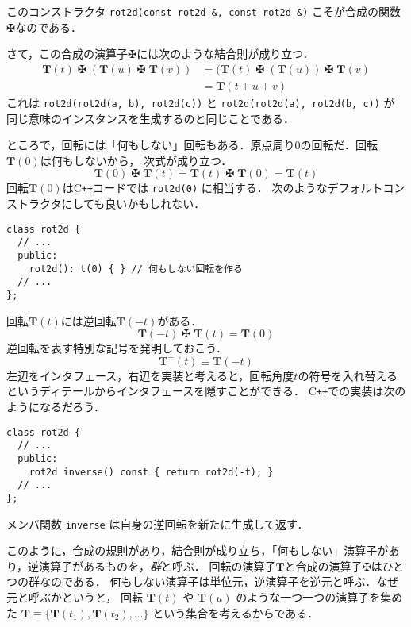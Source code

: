 \documentclass{jsbook}
\newcommand{\cxx}{\textrm{C}\texttt{++}}
\newcommand{\ccode}[1]{\texttt{#1}}
\newcommand{\keyword}[1]{\emph{#1}}
\newcommand{\bop}[1]{\boldsymbol{#1}}
\newcommand{\bg}[1]{\mathbf{#1}}
\newcommand{\opmaltese}{\mathop{\maltese}}
\begin{document}
このコンストラクタ \ccode{rot2d(const rot2d \&, const rot2d \&)} こそが合成の関数$\maltese$なのである．

さて，この合成の演算子$\maltese$には次のような結合則が成り立つ．
\begin{align}
\bop{T}(t)\opmaltese(\bop{T}(u)\opmaltese\bop{T}(v))&=(\bop{T}(t)\opmaltese(\bop{T}(u))\opmaltese\bop{T}(v)\\
  &=\bop{T}(t+u+v)
\end{align}
これは \ccode{rot2d(rot2d(a, b), rot2d(c))} と \ccode{rot2d(rot2d(a), rot2d(b, c))} が
同じ意味のインスタンスを生成するのと同じことである．

ところで，回転には「何もしない」回転もある．原点周り$0$の回転だ．回転$\bop{T}(0)$は何もしないから，
次式が成り立つ．
\begin{equation}
\bop{T}(0)\opmaltese\bop{T}(t)=\bop{T}(t)\opmaltese\bop{T}(0)=\bop{T}(t)
\end{equation}
回転$\bop{T}(0)$は\cxx コードでは \ccode{rot2d(0)} に相当する．
次のようなデフォルトコンストラクタにしても良いかもしれない．

\begin{verbatim}
class rot2d {
  // ...
  public:
    rot2d(): t(0) { } // 何もしない回転を作る
  // ...
};
\end{verbatim}

回転$\bop{T}(t)$には逆回転$\bop{T}(-t)$がある．
\begin{equation}
\bop{T}(-t)\opmaltese\bop{T}(t)=\bop{T}(0)
\end{equation}
逆回転を表す特別な記号を発明しておこう．
\begin{equation}
\bop{T}^{-}(t)\equiv\bop{T}(-t)
\end{equation}
左辺をインタフェース，右辺を実装と考えると，回転角度$t$の符号を入れ替えるというディテールからインタフェースを隠すことができる．
\cxx での実装は次のようになるだろう．

\begin{verbatim}
class rot2d {
  // ...
  public:
    rot2d inverse() const { return rot2d(-t); }
  // ...
};
\end{verbatim}

メンバ関数 \ccode{inverse} は自身の逆回転を新たに生成して返す．

このように，合成の規則があり，結合則が成り立ち，「何もしない」演算子があり，逆演算子があるものを，\keyword{群}と呼ぶ．
回転の演算子$\bop{T}$と合成の演算子$\maltese$はひとつの群なのである．
何もしない演算子は単位元，逆演算子を逆元と呼ぶ．なぜ元と呼ぶかというと，
回転 $\bop{T}(t)$ や $\bop{T}(u)$ のような一つ一つの演算子を集めた $\bg{T}\equiv\{\bop{T}(t_1),\bop{T}(t_2),\dots\}$ という集合を考えるからである．
\end{document}
